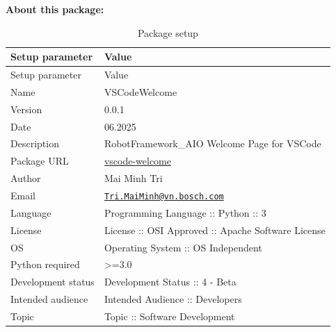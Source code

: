%
%

\textbf{About this package:}

\begin{longtable}[]{@{}ll@{}}
\caption{Package setup}\tabularnewline
\toprule()
Setup parameter & Value \\
\midrule()
\endfirsthead
\toprule()
Setup parameter & Value \\
\midrule()
\endhead
Name & VSCodeWelcome \\
Version & 0.0.1 \\
Date & 06.2025 \\
Description & RobotFramework\_AIO Welcome Page for VSCode \\
Package URL &
\href{https://github.com/test-fullautomation/vscode-welcome}{vscode-welcome} \\
Author & Mai Minh Tri \\
Email &
\href{mailto:Tri.MaiMinh@vn.bosch.com}{\nolinkurl{Tri.MaiMinh@vn.bosch.com}} \\
Language & Programming Language :: Python :: 3 \\
License & License :: OSI Approved :: Apache Software License \\
OS & Operating System :: OS Independent \\
Python required & \textgreater=3.0 \\
Development status & Development Status :: 4 - Beta \\
Intended audience & Intended Audience :: Developers \\
Topic & Topic :: Software Development \\
\bottomrule()
\end{longtable}
